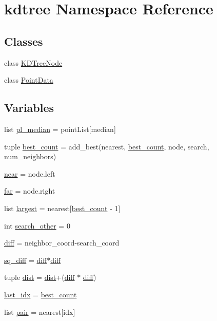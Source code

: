 \hypertarget{namespacekdtree}{
\section{kdtree Namespace Reference}
\label{namespacekdtree}
}
\subsection*{Classes}
\begin{DoxyCompactItemize}
\item 
class \hyperlink{classkdtree_1_1KDTreeNode}{KDTreeNode}
\item 
class \hyperlink{classkdtree_1_1PointData}{PointData}
\end{DoxyCompactItemize}
\subsection*{Variables}
\begin{DoxyCompactItemize}
\item 
list \hyperlink{namespacekdtree_a68dd1b5c2ca51036f48cfb773ef665ac}{pl\_\-median} = pointList\mbox{[}median\mbox{]}
\item 
tuple \hyperlink{namespacekdtree_a5254def45bf553b4ed113993acde66ec}{best\_\-count} = add\_\-best(nearest, \hyperlink{namespacekdtree_a5254def45bf553b4ed113993acde66ec}{best\_\-count}, node, search, num\_\-neighbors)
\item 
\hyperlink{namespacekdtree_a0ba21301aea56f1c2ef165f16bcc6af6}{near} = node.left
\item 
\hyperlink{namespacekdtree_a1098829259a7546f7778cfe19c86e50c}{far} = node.right
\item 
list \hyperlink{namespacekdtree_a8ae4f604fa3b331f0e1857ef7988dbed}{largest} = nearest\mbox{[}\hyperlink{namespacekdtree_a5254def45bf553b4ed113993acde66ec}{best\_\-count} -\/ 1\mbox{]}
\item 
int \hyperlink{namespacekdtree_a697ad02b362c4958d0497573757a329a}{search\_\-other} = 0
\item 
\hyperlink{namespacekdtree_acdecd5b85843a2d9caa9703f3d246c5a}{diff} = neighbor\_\-coord-\/search\_\-coord
\item 
\hyperlink{namespacekdtree_aa6b03574baf9af70ad70c383f1276f53}{sq\_\-diff} = \hyperlink{namespacekdtree_acdecd5b85843a2d9caa9703f3d246c5a}{diff}$\ast$\hyperlink{namespacekdtree_acdecd5b85843a2d9caa9703f3d246c5a}{diff}
\item 
tuple \hyperlink{namespacekdtree_ab18cecee0f3d4292dc06665f88c9dcd1}{dist} = \hyperlink{namespacekdtree_ab18cecee0f3d4292dc06665f88c9dcd1}{dist}+(\hyperlink{namespacekdtree_acdecd5b85843a2d9caa9703f3d246c5a}{diff} $\ast$ \hyperlink{namespacekdtree_acdecd5b85843a2d9caa9703f3d246c5a}{diff})
\item 
\hyperlink{namespacekdtree_a0e2b4f0710247ad4a1bc44217b669f98}{last\_\-idx} = \hyperlink{namespacekdtree_a5254def45bf553b4ed113993acde66ec}{best\_\-count}
\item 
list \hyperlink{namespacekdtree_a2c9210668756589c874996518e7c43dc}{pair} = nearest\mbox{[}idx\mbox{]}
\end{DoxyCompactItemize}


